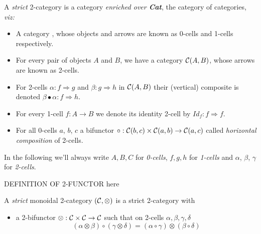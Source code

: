 \documentclass[a4paper]{article}
\begin{document}
\begin{definition}  \label{def:strict-two-cat}
A \emph{strict} 2-category \catC is a category \emph{enriched over
  \textbf{Cat}}, the category of categories, \emph{viz:}
\begin{itemize}
\item A category \catC, whose objects and arrows are known as
  0-cells and 1-cells respectively.
\item For every pair of objects $A$ and $B$, we have a
  category ${\cal C}(A, B)$, whose arrows are known as 2-cells.
\item For 2-cells $\alpha : f \Rightarrow g$ and $\beta : g
  \Rightarrow h$ in ${\cal C}(A,B)$ their (vertical) composite is denoted
  $\beta\bullet\alpha : f \Rightarrow h$.
\item For every 1-cell $f:A\to B$ we denote its identity 2-cell by
  $Id_f:f \Rightarrow f$.
\item For all 0-cells $a$, $b$, $c$ a bifunctor $\circ: {\cal C}(b, c)
  \times {\cal C}(a, b) \to {\cal C}(a, c)$ called \emph{horizontal
    composition} of 2-cells.
\end{itemize}
\end{definition}

\noindent
In the following we'll always write $A, B, C$ for \emph{0-cells}, $f,
g, h$ for \emph{1-cells} and $\alpha$, $\beta$, $\gamma$ for
\emph{2-cells}.

\begin{definition}
  \label{def:two-functor}
  DEFINITION OF 2-FUNCTOR here
\end{definition}


\begin{definition}\label{def:monoidal-two-cat}
A \emph{strict} monoidal 2-category $({\cal C}, \otimes)$ is a strict
2-category with
\begin{itemize}
\item a 2-bifunctor $\otimes: {\cal C} \times {\cal C} \to {\cal C}$ such that
  on 2-cells $\alpha, \beta, \gamma, \delta$
\[
(\alpha \otimes \beta) \circ (\gamma \otimes \delta) = (\alpha \circ \gamma)
  \otimes (\beta \circ \delta)
\]
\end{itemize}
\end{definition}
\end{document}

